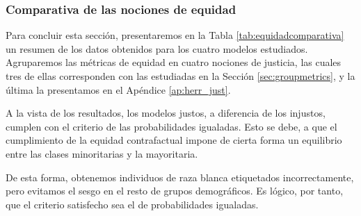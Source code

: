 \documentclass[oneside,openright,titlepage,numbers=noenddot,openany,headinclude,footinclude=true,
cleardoublepage=empty,abstractoff,BCOR=5mm,paper=a4,fontsize=12pt,main=spanish]{scrreprt}
\begin{document}
\subsubsection*{Comparativa de las nociones de equidad}

Para concluir esta sección, presentaremos en la Tabla \ref{tab:equidadcomparativa} un resumen de los datos obtenidos para los cuatro modelos estudiados. Agruparemos las métricas de equidad en cuatro nociones de justicia, las cuales tres de ellas corresponden con las estudiadas en la Sección \ref{sec:groupmetrics}, y la última la presentamos en el Apéndice \ref{ap:herr_just}.

A la vista de los resultados, los modelos justos, a diferencia de los injustos, cumplen con el criterio de las probabilidades igualadas. Esto se debe, a que el cumplimiento de la equidad contrafactual impone de cierta forma un equilibrio entre las clases minoritarias y la mayoritaria. 


\clearpage

De esta forma, obtenemos individuos de raza blanca etiquetados incorrectamente, pero evitamos el sesgo en el resto de grupos demográficos. Es lógico, por tanto, que el criterio satisfecho sea el de probabilidades igualadas.\\
\end{document}
